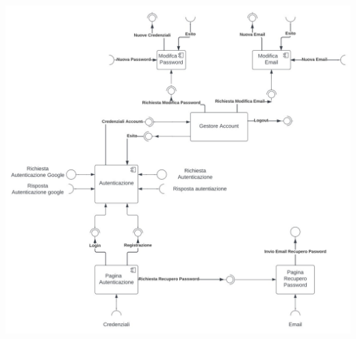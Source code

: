 \documentclass[11pt, a4paper]{article}
\theoremstyle{definition} %
\begin{document}
\begin{center}
    \includegraphics[width=1.2\textwidth]{materiale/login-component.jpg}
\end{center}
    

    
\end{document}
